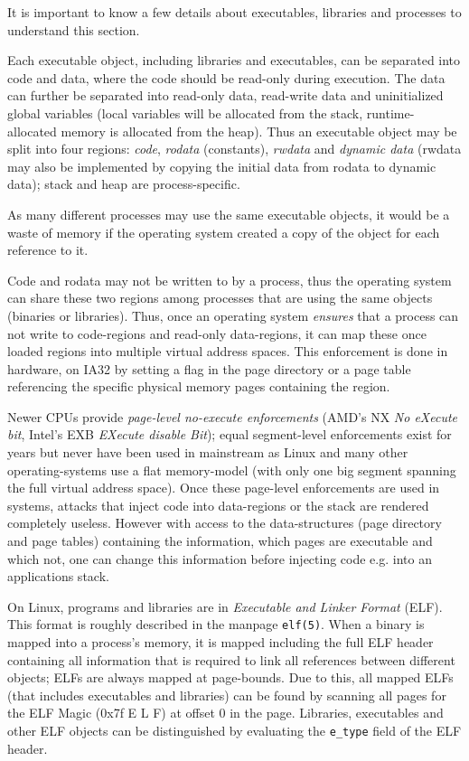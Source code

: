 It is important to know a few details about executables, libraries and processes
to understand this section.

Each executable object, including libraries and executables, can be separated
into code and data, where the code should be read-only during execution. The
data can further be separated into read-only data, read-write data and
uninitialized global variables (local variables will be allocated from the
stack, runtime-allocated memory is allocated from the heap).  Thus an executable
object may be split into four regions: \emph{code}, \emph{rodata} (constants),
\emph{rwdata} and \emph{dynamic data} (rwdata may also be implemented by copying
the initial data from rodata to dynamic data); stack and heap are
process-specific.

As many different processes may use the same executable objects, it would be a
waste of memory if the operating system created a copy of the object for each
reference to it.

Code and rodata may not be written to by a process, thus the operating system
can share these two regions among processes that are using the same objects
(binaries or libraries).  Thus, once an operating system \emph{ensures} that a
process can not write to code-regions and read-only data-regions, it can map
these once loaded regions into multiple virtual address spaces. This enforcement
is done in hardware, on IA32 by setting a flag in the page directory or a page
table referencing the specific physical memory pages containing the region.

Newer CPUs provide \emph{page-level no-execute enforcements} (AMD's NX \emph{No
eXecute bit}, Intel's EXB \emph{EXecute disable Bit}); equal segment-level
enforcements exist for years but never have been used in mainstream as Linux and
many other operating-systems use a flat memory-model (with only one big segment
spanning the full virtual address space).  Once these page-level enforcements
are used in systems, attacks that inject code into data-regions or the stack are
rendered completely useless. However with access to the data-structures (page
directory and page tables) containing the information, which pages are
executable and which not, one can change this information before injecting code
e.g. into an applications stack. 

On Linux, programs and libraries are in \emph{Executable and Linker Format}
(ELF).  This format is roughly described in the manpage \texttt{elf(5)}. When a
binary is mapped into a process's memory, it is mapped including the full ELF
header containing all information that is required to link all references
between different objects; ELFs are always mapped at page-bounds. Due to this,
all mapped ELFs (that includes executables and libraries) can be found by
scanning all pages for the ELF Magic (0x7f E L F) at offset $0$ in the page.
Libraries, executables and other ELF objects can be distinguished by evaluating
the \texttt{e\_type} field of the ELF header.

